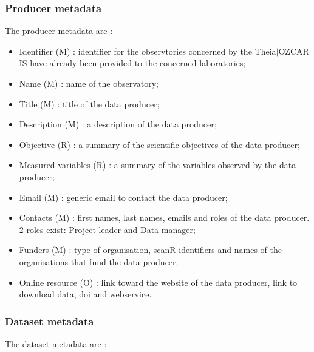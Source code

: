 \subsubsection{Producer metadata}

The producer metadata are : 

\begin{itemize}
\item 	 Identifier (M) : identifier for the observtories concerned by the Theia$\vert$OZCAR IS have already been provided to the concerned laboratories;
\item 	 Name (M) : name of the observatory;
\item 	 Title (M) : title of the data producer;
\item 	 Description (M) : a description of the data producer;
\item 	 Objective (R) : a summary of the scientific objectives of the data producer;
\item 	 Measured variables (R) : a summary of the variables observed by the data producer;
\item 	 Email (M) : generic email to contact the data producer;
\item 	 Contacts (M) : first names, last names, emails and roles of the data producer. 2 roles exist: Project leader and Data manager;
\item 	 Funders (M) : type of organisation, scanR identifiers and names of the organisations that fund the data producer;
\item 	 Online resource (O) : link toward the website of the data producer, link to download data, doi and webservice.
\end{itemize}

\subsubsection{Dataset metadata}

The dataset metadata are : 

